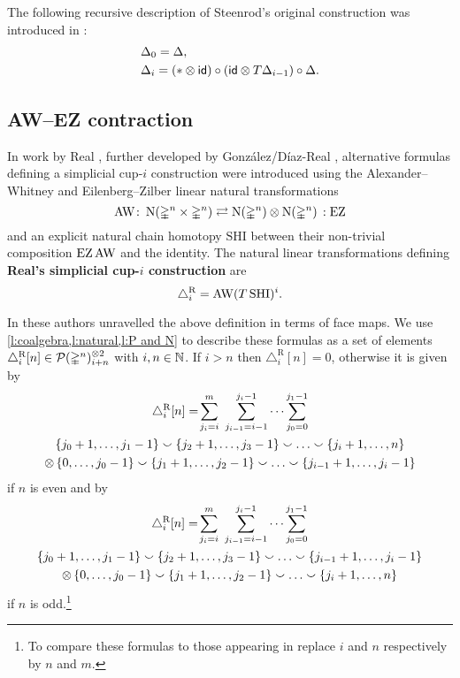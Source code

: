\begin{remark*}
	The following recursive description of Steenrod's original construction was introduced in \cite{medina2023dennis}:
	\begin{equation}\label{e:prop cup-i}
		\begin{split}
			& \Delta_0 = \Delta, \\
			& \Delta_i =
			(\ast \otimes \mathsf{id}) \circ (\mathsf{id} \otimes T \Delta_{i-1}) \circ \Delta.
		\end{split}
	\end{equation}
\end{remark*}

\subsection{AW--EZ contraction}\label{ss:real}

In work by Real \cite{real1996computability}, further developed by Gonz\'alez\-/D\'iaz\--Real \cite{gonzalez-diaz1999steenrod, gonzalez2003computation, gonzalez-diaz2005cocyclic}, alternative formulas defining a simplicial \mbox{cup-$i$} construction were introduced using the Alexander--Whitney and Eilenberg--Zilber linear natural transformations
\[
\operatorname{AW} \colon \operatorname{N}(\mathbb{\Delta}^n \times \mathbb{\Delta}^n)
\rightleftarrows
\operatorname{N}(\mathbb{\Delta}^n) \otimes \operatorname{N}(\mathbb{\Delta}^n) \,: \operatorname{EZ}
\]
and an explicit natural chain homotopy $\mathrm{SHI}$ between their non-trivial composition $\operatorname{EZ} \operatorname{AW}$ and the identity.
The natural linear transformations defining \textbf{Real's simplicial \mbox{cup-$i$} construction} are
\[
\triangle^{\mathrm{R}}_i = \operatorname{AW} (T \, \mathrm{SHI})^i.
\]

In \cite[Theorem~3.1]{gonzalez-diaz1999steenrod} these authors unravelled the above definition in terms of face maps.
We use \cref{l:coalgebra,l:natural,l:P and N} to describe these formulas as a set of elements $\triangle_i^{\mathrm{R}} [n] \in \mathcal{P}(\mathbb{\Delta}^n)^{\otimes 2}_{i+n}$ with $i,n \in \mathbb{N}$.
If $i > n$ then $\triangle_i^{\mathrm{R}} [n] = 0$, otherwise it is given by
\begin{multline}\label{eq:real left}
	\triangle^{\mathrm{R}}_i [n] = \!
	\sum_{j_i=i}^{m} \ \sum_{j_{i-1}=i-1}^{j_i-1} \dots \sum_{j_0=0}^{j_1-1} \\
	\{j_0+1,\dots,j_1-1\} \union \{j_2+1,\dots,j_3-1\} \union \dots \union \{j_i+1,\dots,n\} \\ \ot \,
	\{0,\dots,j_0-1\} \union \{j_1+1,\dots,j_2-1\} \union \dots \union \{j_{i-1}+1,\dots,j_i-1\}
\end{multline}
if $n$ is even and by
\begin{multline}\label{eq:real right}
	\triangle^\rR_i [n] = \!
	\sum_{j_i=i}^{m} \ \sum_{j_{i-1}=i-1}^{j_i-1} \dots \sum_{j_0=0}^{j_1-1} \\
	\{j_0+1,\dots,j_1-1\} \union \{j_2+1,\dots,j_3-1\} \union \dots \union \{j_{i-1}+1,\dots,j_i-1\} \\ \ot \,
	\{0,\dots,j_0-1\} \union \{j_1+1,\dots,j_2-1\} \union \dots \union \{j_i+1,\dots,n\}
\end{multline}
if $n$ is odd.\footnote{To compare these formulas to those appearing in \cite[Theorem~3.1]{gonzalez-diaz1999steenrod} replace $i$ and $n$ respectively by $n$ and $m$.}

